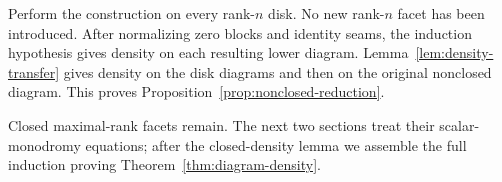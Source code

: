 Perform the construction on every rank-$n$ disk.  No new rank-$n$
facet has been introduced.  After normalizing zero blocks and
identity seams, the induction hypothesis gives density on each
resulting lower diagram.  Lemma~\ref{lem:density-transfer} gives
density on the disk diagrams and then on the original nonclosed
diagram.  This proves Proposition~\ref{prop:nonclosed-reduction}.

Closed maximal-rank facets remain.  The next two sections treat their
scalar-monodromy equations; after the closed-density lemma we assemble
the full induction proving Theorem~\ref{thm:diagram-density}.
